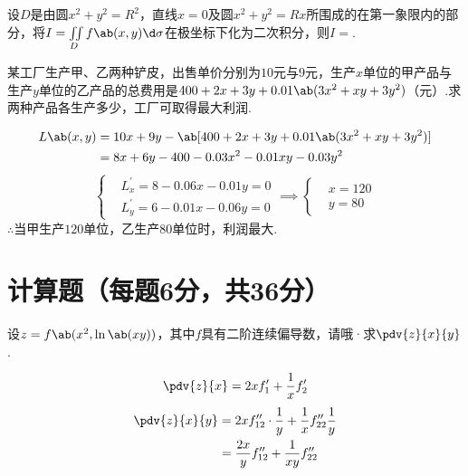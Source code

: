 \begin{exercise}
    设$D$是由圆$x^2+y^2=R^2$，直线$x=0$及圆$x^2+y^2=Rx$所围成的在第一象限内的部分，将$I=\iint\limits_D{f\ab(x,y)\d\sigma}$在极坐标下化为二次积分，则$I=$.
\end{exercise}

\begin{exercise}
    某工厂生产甲、乙两种铲皮，出售单价分别为$10$元与$9$元，生产$x$单位的甲产品与生产$y$单位的乙产品的总费用是$400+2x+3y+0.01\ab(3x^2+xy+3y^2)$（元）.求两种产品各生产多少，工厂可取得最大利润.
\end{exercise}
\begin{solution}
    $$
    \begin{aligned}
        L\ab(x,y)&=10x+9y-\ab[400+2x+3y+0.01\ab(3x^2+xy+3y^2)]\\
        &=8x+6y-400-0.03x^2-0.01xy-0.03y^2
    \end{aligned}
    $$
    $$
    \left\{
        \begin{aligned}
            &L_x^{\prime}=8-0.06x-0.01y=0\\
            &L_y^{\prime}=6-0.01x-0.06y=0
        \end{aligned}
    \right.\implies
    \left\{
        \begin{aligned}
            &x=120\\
            &y=80
        \end{aligned}
    \right.
    $$
    $\therefore$当甲生产$120$单位，乙生产$80$单位时，利润最大.
\end{solution}

\section{计算题（每题6分，共36分）}
\begin{exercise}
    设$z=f\ab(x^2,\ln\ab(xy))$，其中$f$具有二阶连续偏导数，请哦·求$\pdv{z}{x}{y}$.
\end{exercise}
\begin{solution}
    $$\pdv{z}{x}=2xf_1^{\prime}+\frac{1}{x}f_2^{\prime}$$
    $$
    \begin{aligned}
        \pdv{z}{x}{y}&=2xf_{12}^{\prime\prime}\cdot\frac{1}{y}+\frac{1}{x}f_{22}^{\prime\prime}\frac{1}{y}\\
        &=\frac{2x}{y}f_{12}^{\prime\prime}+\frac{1}{xy}f_{22}^{\prime\prime}
    \end{aligned}
    $$
\end{solution}

